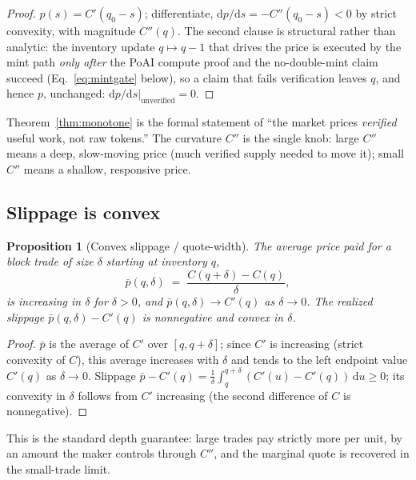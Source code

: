 \documentclass[11pt]{article}
\newtheorem{proposition}[theorem]{Proposition}
\newcommand{\dd}{\mathrm{d}}
\begin{document}
\begin{proof}
$p(s)=C'(q_0-s)$; differentiate, $\dd p/\dd s = -C''(q_0-s)<0$ by strict
convexity, with magnitude $C''(q)$. The second clause is structural rather than
analytic: the inventory update $q\mapsto q-1$ that drives the price is executed by
the mint path \emph{only after} the PoAI compute proof and the no-double-mint claim
succeed (Eq.~\eqref{eq:mintgate} below), so a claim that fails verification leaves
$q$, and hence $p$, unchanged: $\dd p/\dd s\big|_{\text{unverified}}=0$.
\end{proof}

Theorem~\ref{thm:monotone} is the formal statement of ``the market prices
\emph{verified} useful work, not raw tokens.'' The curvature $C''$ is the single
knob: large $C''$ means a deep, slow-moving price (much verified supply needed to
move it); small $C''$ means a shallow, responsive price.

\subsection{Slippage is convex}

\begin{proposition}[Convex slippage / quote-width]
\label{prop:slippage}
The average price paid for a block trade of size $\delta$ starting at inventory
$q$,
\begin{equation}
\bar p(q,\delta) \;=\; \frac{C(q+\delta)-C(q)}{\delta},
\end{equation}
is increasing in $\delta$ for $\delta>0$, and
$\bar p(q,\delta)\to C'(q)$ as $\delta\to 0$. The realized slippage
$\bar p(q,\delta)-C'(q)$ is nonnegative and convex in $\delta$.
\end{proposition}

\begin{proof}
$\bar p$ is the average of $C'$ over $[q,q+\delta]$; since $C'$ is increasing
(strict convexity of $C$), this average increases with $\delta$ and tends to the
left endpoint value $C'(q)$ as $\delta\to0$. Slippage
$\bar p - C'(q) = \tfrac1\delta\int_q^{q+\delta}(C'(u)-C'(q))\,\dd u\ge 0$;
its convexity in $\delta$ follows from $C'$ increasing (the second difference of
$C$ is nonnegative).
\end{proof}

This is the standard depth guarantee: large trades pay strictly more per unit, by
an amount the maker controls through $C''$, and the marginal quote is recovered in
the small-trade limit.
\end{document}
